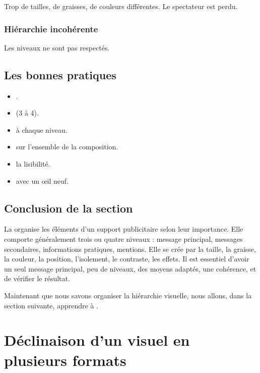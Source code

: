 Trop de tailles, de graisses, de couleurs différentes. Le spectateur est perdu.

\subsubsection{Hiérarchie incohérente}

Les niveaux ne sont pas respectés.

\subsection{Les bonnes pratiques}

\begin{itemize}
    \item {}.
    \item {} (3 à 4).
    \item {} à chaque niveau.
    \item {} sur l'ensemble de la composition.
    \item {} la lisibilité.
    \item {} avec un œil neuf.
\end{itemize}

\subsection*{Conclusion de la section}

La  organise les éléments d'un support publicitaire selon leur importance. Elle comporte généralement trois ou quatre niveaux : message principal, messages secondaires, informations pratiques, mentions. Elle se crée par la taille, la graisse, la couleur, la position, l'isolement, le contraste, les effets. Il est essentiel d'avoir un seul message principal, peu de niveaux, des moyens adaptés, une cohérence, et de vérifier le résultat.

Maintenant que nous savons organiser la hiérarchie visuelle, nous allons, dans la section suivante, apprendre à .

\section{Déclinaison d'un visuel en plusieurs formats}

